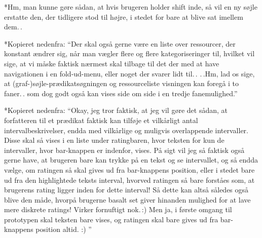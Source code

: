 \documentclass{report}
\begin{document}
*Hm, man kunne gøre sådan, at hvis brugeren holder shift inde, så vil en ny søjle erstatte den, der tidligere stod til højre, i stedet for bare at blive sat imellem dem.\,.

*Kopieret nedenfra: ``Der skal også gerne være en liste over ressourcer, der konstant ændrer sig, når man vægler flere og flere kategoriseringer til, hvilket vil sige, at vi måske faktisk nærmest skal tilbage til det der med at have navigationen i en fold-ud-menu, eller noget der svarer lidt til.\,. .\,.Hm, lad os sige, at (graf-)søjle-prædikatsøgningen og ressourceliste visningen kan foregå i to faner.\,. som dog godt også kan vises side om side i en tredje fanemulighed.''

*Kopieret nedenfra: ``Okay, jeg tror faktisk, at jeg vil gøre det sådan, at forfatteren til et prædikat faktisk kan tilføje et vilkårligt antal intervalbeskrivelser, endda med vilkårlige og muligvis overlappende intervaller. Disse skal så vises i en liste under ratingbaren, hvor teksten for kun de intervaller, hvor bar-knappen er indenfor, vises. På sigt vil jeg så faktisk også gerne have, at brugeren bare kan trykke på en tekst og se intervallet, og så endda vælge, om ratingen så skal gives ud fra bar-knappens position, eller i stedet bare ud fra den highlightede teksts interval, hvorved ratingen så bare forståes som, at brugerens rating ligger inden for dette interval! Så dette kan altså således også blive den måde, hvorpå brugerne basalt set giver hinanden mulighed for at lave mere diskrete ratings! Virker fornuftigt nok.\,:) Men ja, i første omgang til prototypen skal teksten bare vises, og ratingen skal bare gives ud fra bar-knappens position altid. :) ''
\end{document}
